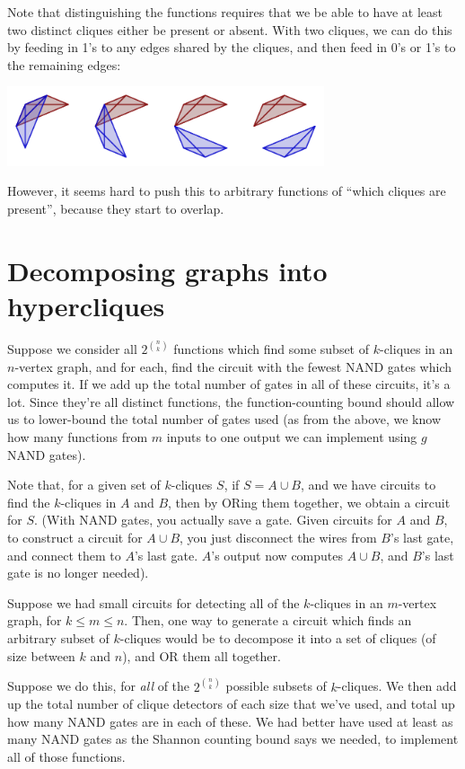 \documentclass[12pt]{article}
\theoremstyle{definition}
\begin{document}
Note that distinguishing the functions requires that we be able to have at
least two distinct cliques either be present or absent. With two cliques,
we can do this by feeding in 1's to any edges shared by the cliques, and
then feed in 0's or 1's to the remaining edges:

\includegraphics[width=0.7\textwidth]{R/overlapping.pdf}

However, it seems hard to push this to arbitrary functions of ``which cliques are
present'', because they start to overlap.

\section{Decomposing graphs into hypercliques}

Suppose we consider all $2^{n \choose k}$ functions which find some subset
of $k$-cliques in an $n$-vertex graph, and for each, find the circuit with
the fewest NAND gates which computes it. If we add up the total number of
gates in all of these circuits,
it's a lot. Since they're all distinct functions, the
function-counting bound should
allow us to lower-bound the total number of gates used (as from the
above, we know how many functions from $m$ inputs to one output
we can implement using $g$ NAND gates).

Note that, for a given set of $k$-cliques $S$, if $S = A \cup B$, and we
have circuits to find the $k$-cliques in $A$ and $B$, then by ORing them
together, we obtain a circuit for $S$. (With NAND gates, you actually
save a gate. Given circuits for $A$ and $B$, to construct a circuit
for $A \cup B$, you just disconnect the wires from $B$'s last gate, and
connect them to $A$'s last gate. $A$'s output now computes $A \cup B$,
and $B$'s last gate is no longer needed).

Suppose we had small circuits for detecting all of the $k$-cliques
in an $m$-vertex graph, for $k \le m \le n$.
Then, one way to generate a circuit which finds an arbitrary subset
of $k$-cliques would be to decompose it into a set of
cliques (of size between $k$ and $n$), and OR them all together.

Suppose we do this, for {\em all} of the $2^{n \choose k}$ possible subsets of
$k$-cliques. We then add up the total number of clique detectors of each
size that we've used, and total up how many NAND gates are in each of these.
We had better have used at least as many NAND gates as the Shannon counting
bound says we needed, to implement all of those functions.
\end{document}

